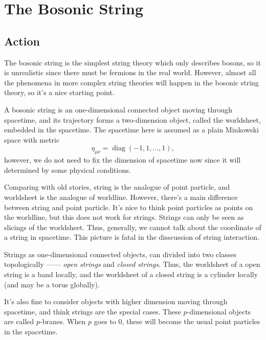 \chapter{The Bosonic String}

\section{Action}

The bosonic string is the simplest string theory which only
describes bosons, so it is unrealistic since 
there must be fermions in the real world. However, almost
all the phenomena in more complex string theories will happen
in the bosonic string theory, so it's a nice starting point.

A bosonic string is an one-dimensional connected object moving 
through spacetime, and its trajectory forms a two-dimension object, 
called the worldsheet, embedded in the spacetime. 
The spacetime here is assumed as a plain
Minkowski space with metric
\[
	\eta_{\mu\nu}=\operatorname{diag}(-1,1,\dots,1),
\]
however, we do not need to fix the dimension of
spacetime now since it will determined by some physical conditions.

Comparing with old stories, 
string is the analogue of point particle, 
and worldsheet is the analogue of worldline. 
However, there's a main difference
between string and point particle. It's nice to think 
point particles as points on the worldline, but this does not
work for strings. Strings can only be seen as slicings of 
the worldsheet. Thus, generally, we cannot talk about the 
coordinate of a string in spacetime. This picture is fatal 
in the disscussion of string interaction.

Strings as one-dimensional connected objects, can divided 
into two classes topologically ------ \textit{open strings} 
and \textit{closed strings}. Thus, the 
worldsheet of a open string is a band locally, and 
the worldsheet of a closed string is a cylinder locally
(and may be a torus globally).

It's also fine to consider objects with higher dimension moving 
through spacetime, and think strings are the special cases. These 
$p$-dimensional objects are called $p$-branes. When $p$ goes to 
$0$, these will become the usual point particles in the spacetime.

